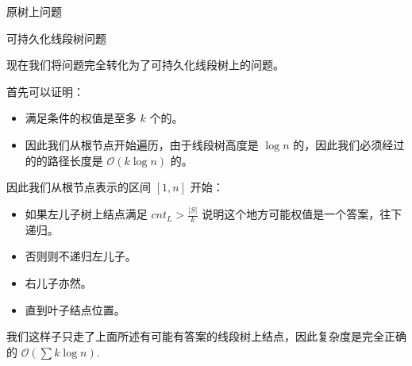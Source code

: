 \documentclass{beamer}
\begin{document}
{\begin{frame}{原树上问题}
\end{frame}


\begin{frame}{可持久化线段树问题}

现在我们将问题完全转化为了可持久化线段树上的问题。

首先可以证明：

\begin{itemize}
  \item 满足条件的权值是至多 $k$ 个的。
  \item 因此我们从根节点开始遍历，由于线段树高度是 $\log n$ 的，因此我们必须经过的的路径长度是 $\mathcal{O}(k \log n)$ 的。
\end{itemize}

因此我们从根节点表示的区间 $[1, n]$ 开始：

\begin{itemize}
  \item 如果左儿子树上结点满足 $cnt_L > \frac{|S|}{k}$ 说明这个地方可能权值是一个答案，往下递归。
  \item 否则则不递归左儿子。
  \item 右儿子亦然。
  \item 直到叶子结点位置。
\end{itemize}

我们这样子只走了上面所述有可能有答案的线段树上结点，因此复杂度是完全正确的 $\mathcal{O}(\sum k \log n)$.

\end{frame}


}
\end{document}
